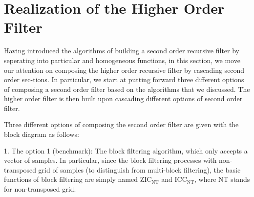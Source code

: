 \section{Realization of the Higher Order Filter}
\label{sec:implementation}

Having introduced the algorithms of building a second order recursive filter by seperating into 
particular and homogeneous functions, in this section, we move our attention on composing the higher
order recursive filter by cascading second order sec-tions.
In particular, we start at putting forward three different options of composing a second order filter
based on the algo\-rithms that we discussed. The higher order filter is then built upon
cascading different options of second order filter. 



Three different options of composing the second order filter are given with the block diagram as follows:

1. The option 1 (benchmark): The block filtering algorithm, which only accepts a vector of samples. In particular, since the block filtering
processes with non-transposed grid of samples (to distinguish from multi-block filtering), the basic functions of block filtering
are simply named $\text{ZIC}_{\text{NT}}$ and $\text{ICC}_{\text{NT}}$, where NT stands for non-transposed grid.

    
